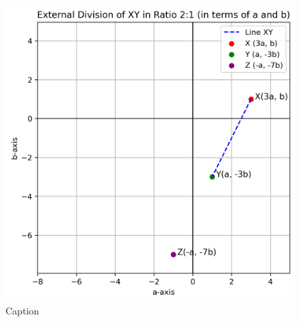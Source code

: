 \documentclass[journal]{IEEEtran}
\begin{document}
\begin{figure}[h!]
    \centering
    \includegraphics[width=0.8\linewidth]{figs/01.png}
    \caption{Caption}
    \label{fig:placeholder}
\end{figure}
\end{document}

